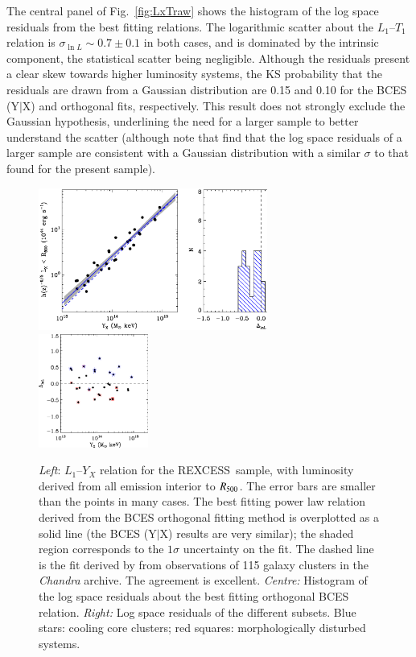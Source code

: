 \documentclass[oldversion]{aa}
\newcommand{\rexcess}{{\gwpfont REXCESS}}
\begin{document}
{The central panel of Fig.~\ref{fig:LxTraw} shows the histogram of
the log space residuals from the best fitting relations. The logarithmic 
scatter about the $L_1$--$T_1$ relation is $\sigma_{\ln{L}} \sim 0.7\pm0.1$ in both cases, and is dominated by the intrinsic component, the statistical scatter
being negligible. Although the residuals present a clear skew towards higher luminosity systems, the KS probability that the residuals are drawn from a Gaussian distribution are 0.15 and 0.10
for the BCES (Y$|$X) and orthogonal fits, respectively. This result does not strongly exclude the Gaussian hypothesis, underlining the need for a larger sample to better understand the scatter (although note that \citealt{nsh02} find that the log space residuals of a larger sample are consistent with a Gaussian distribution with a similar $\sigma$ to that found for the present sample).

\begin{figure}[]
\centering
\includegraphics[width=0.67\textwidth]{0944f4a.ps}
\includegraphics[width=0.32\textwidth]{0944f4b.eps}
\caption{{\footnotesize {\it Left}: $L_1$--$Y_X$ relation for the
    \rexcess\ sample, with luminosity derived from all
    emission interior to $R_{500}$. The error bars are smaller than the
    points in many cases. The best fitting power law relation
    derived from the BCES orthogonal fitting method is 
    overplotted as a solid line (the BCES (Y$|$X) results are very similar); the shaded region corresponds to the $1\sigma$ uncertainty on the fit. The dashed line is the fit derived
    by \citet{maughan07} from observations of 115 galaxy clusters in
    the {\it Chandra} archive. The agreement is excellent. {\em Centre:} Histogram of the log space residuals about the best fitting orthogonal BCES relation.  {\em
      Right:} Log space residuals of the different subsets. Blue stars: cooling core clusters; red squares: morphologically disturbed systems.}}\label{fig:YxLxraw} 
   \end{figure}

}
\end{document}
